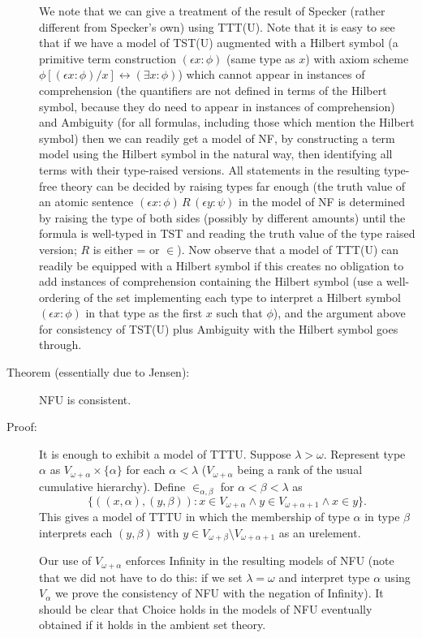 \documentclass[112pt]{article}
\begin{document}
\begin{description}
We note that we can give a treatment of the result of Specker (rather different from Specker's own) using TTT(U).  Note that it is easy to see that if we have a model of TST(U) augmented with a Hilbert symbol (a primitive term construction $(\epsilon x:\phi)$ (same type as $x$) with axiom scheme $\phi[(\epsilon x:\phi)/x] \leftrightarrow (\exists x:\phi)$) which cannot appear in instances of comprehension (the quantifiers are not defined in terms of the Hilbert symbol, because they do need to appear in instances of comprehension) and Ambiguity (for all formulas, including those which mention the Hilbert symbol) then we can readily get a model of NF, by constructing a term model using the Hilbert symbol in the natural way, then identifying all terms with their type-raised versions.  All statements in the resulting type-free theory can be decided by raising types far enough (the truth value of an atomic sentence $(\epsilon x:\phi) \,R\, (\epsilon y:\psi)$ in the model of NF is determined by raising the type of both sides (possibly by different amounts) until the formula is well-typed in TST and reading the truth value of the type raised version;  $R$ is either = or $\in$).  Now observe that a model of TTT(U) can readily be equipped with a Hilbert symbol if this creates no obligation to add instances of comprehension
containing the Hilbert symbol (use a well-ordering of the set implementing each type to interpret a Hilbert symbol  $(\epsilon x:\phi)$ in that type as the first $x$ such that $\phi$), and the argument above for consistency of TST(U) plus Ambiguity with the Hilbert symbol goes through.

\item[Theorem (essentially due to Jensen):]  NFU is consistent.

\item[Proof:]  It is enough to exhibit a model of TTTU.  Suppose $\lambda>\omega$.  Represent type $\alpha$ as $V_{\omega+\alpha} \times \{\alpha\}$ for each $\alpha<\lambda$ ($V_{\omega+\alpha}$ being a rank of the usual cumulative hierarchy).  Define $\in_{\alpha,\beta}$ for
$\alpha<\beta<\lambda$ as $$\{((x,\alpha),(y,\beta)):x \in V_{\omega+\alpha} \wedge y \in V_{\omega+\alpha+1} \wedge x \in y\}.$$  This gives a model of TTTU in which the membership of
type $\alpha$ in type $\beta$ interprets each $(y,\beta)$ with $y \in V_{\omega+\beta} \setminus V_{\omega+\alpha+1}$ as an urelement.

Our use of $V_{\omega+\alpha}$ enforces Infinity in the resulting models of NFU (note that we did not have to do this:  if we set $\lambda=\omega$ and interpret type $\alpha$ using $V_\alpha$ we prove the consistency of NFU with the negation of Infinity).  It should be clear that Choice holds in the models of NFU eventually obtained if it holds in the ambient set theory.


\end{description}
\end{document}
